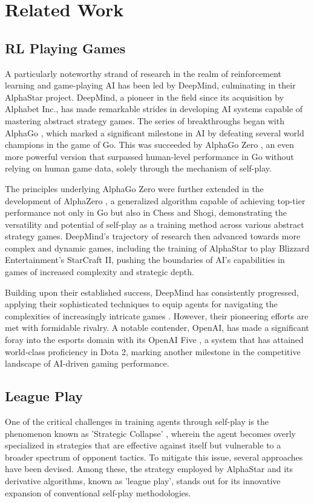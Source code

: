 \documentclass[journal]{IEEEtran}
\begin{document}
	
	\section{Related Work}
	\label{sec:related_work}
	
	\subsection{RL Playing Games}
	
	A particularly noteworthy strand of research in the realm of reinforcement learning and game-playing AI has been led by DeepMind, culminating in their AlphaStar project. 
	DeepMind, a pioneer in the field since its acquisition by Alphabet Inc., has made remarkable strides in developing AI systems capable of mastering abstract strategy games. 
	The series of breakthroughs began with AlphaGo \cite{silver2016}, 
	which marked a significant milestone in AI by defeating several world champions in the game of Go.
	This was succeeded by AlphaGo Zero \cite{silver2017}, an even more powerful version that surpassed human-level performance in Go without relying on human game data, solely through the mechanism of self-play.
		
	The principles underlying AlphaGo Zero were further extended in the development of AlphaZero \cite{silver2017a}, 
	a generalized algorithm capable of achieving top-tier performance not only in Go but also in Chess and Shogi, 
	demonstrating the versatility and potential of self-play as a training method across various abstract strategy games. 
	DeepMind's trajectory of research then advanced towards more complex and dynamic games, 
	including the training of AlphaStar \cite{vinyals2019} to play Blizzard Entertainment's StarCraft II, 
	pushing the boundaries of AI's capabilities in games of increased complexity and strategic depth. 
	
	Building upon their established success, DeepMind has consistently progressed, applying their sophisticated techniques to equip agents for navigating the complexities of increasingly intricate games \cite{schrittwieser2020, perolat2022, fawzi2022}. 
	However, their pioneering efforts are met with formidable rivalry. 
	A notable contender, OpenAI, has made a significant foray into the esports domain with its OpenAI Five \cite{openai2019}, a system that has attained world-class proficiency in Dota 2, marking another milestone in the competitive landscape of AI-driven gaming performance.
	
	\subsection{League Play}	
	One of the critical challenges in training agents through self-play is the phenomenon known as 'Strategic Collapse' \cite{balduzzi2019},
	wherein the agent becomes overly specialized in strategies that are effective against itself but vulnerable to a broader spectrum of opponent tactics. 
	To mitigate this issue, several approaches have been devised. 
	Among these, the strategy employed by AlphaStar and its derivative algorithms\cite{wang2021, mathieu2023}, known as 'league play',
	stands out for its innovative expansion of conventional self-play methodologies. 
	
\end{document}
